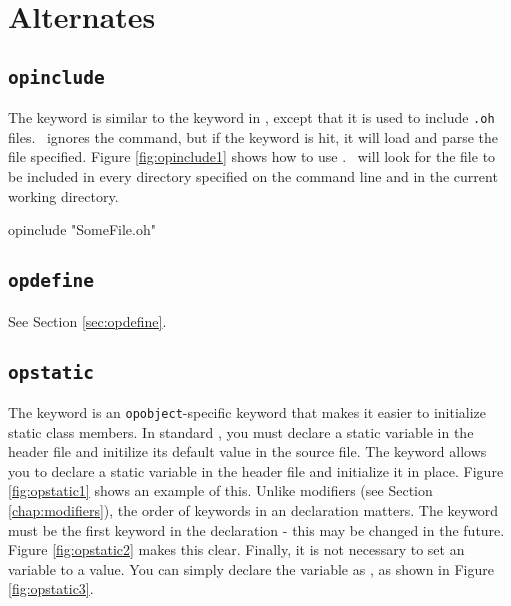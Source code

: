 
\chapter{Alternates}
\label{chap:alternates}

\section{{\tt opinclude}}

The  keyword is similar to the  keyword in \cpp, except that it is used to include {\tt .oh} files.  \opCPP\ ignores the  command, but if the  keyword is hit, it will load and parse the file specified.  Figure \ref{fig:opinclude1} shows how to use .  \opCPP\ will look for the file to be included in every directory specified on the command line and in the current working directory.

\begin{opcpp}[label={fig:opinclude1},caption={The \opcppK{opinclude} keyword.}]
opinclude "SomeFile.oh"
\end{opcpp}

\section{{\tt opdefine}}

See Section \ref{sec:opdefine}.

\section{{\tt opstatic}}

The  keyword is an {\tt opobject}-specific keyword that makes it easier to initialize static class members.  In standard \cpp, you must declare a static variable in the header file and initilize its default value in the source file.  The  keyword allows you to declare a static variable in the header file and initialize it in place.  Figure \ref{fig:opstatic1} shows an example of this.  Unlike modifiers (see Section \ref{chap:modifiers}), the order of keywords in an  declaration matters.  The  keyword must be the first keyword in the declaration - this may be changed in the future.  Figure \ref{fig:opstatic2} makes this clear.  Finally, it is not necessary to set an  variable to a value.  You can simply declare the variable as , as shown in Figure \ref{fig:opstatic3}.

